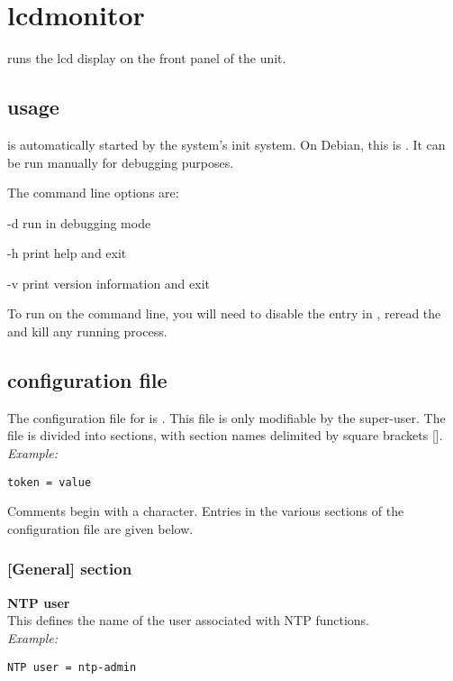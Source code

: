 \section{lcdmonitor \label{slcdmonitor}}

 runs the lcd display on the front panel of the  unit.

\subsection{usage}
 is automatically started by the system's init system.
On Debian, this is . It can be run manually for debugging purposes.

The command line options are:
\begin{description*}
	\item[-d]	run in debugging mode
	\item[-h]	print help and exit
	\item[-v]	print version information and exit
\end{description*}
To run  on the command line, you will need to disable the entry in ,
reread the  and kill any running  process.

\subsection{configuration file}

The configuration file for  is . This file is
only modifiable by the super-user. The file is divided into
sections, with section names delimited by square brackets [\space]. \\
\textit{Example:}
\begin{lstlisting}
token = value
\end{lstlisting}
Comments begin with a \cc{\#} character. Entries in the various sections of the configuration file
are given below. 

\subsubsection{[General] section}

{\bfseries NTP user}\\
This  defines the name of the user associated with NTP functions.\\
\textit{Example:}
\begin{lstlisting}
NTP user = ntp-admin
\end{lstlisting}

